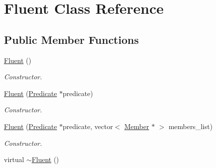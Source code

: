\hypertarget{classFluent}{\section{Fluent Class Reference}
\label{classFluent}
}
\subsection*{Public Member Functions}
\begin{DoxyCompactItemize}
\item 
\hypertarget{classFluent_a6305aaaef1dbd758c02ef9666f4e2b80}{\hyperlink{classFluent_a6305aaaef1dbd758c02ef9666f4e2b80}{Fluent} ()}\label{classFluent_a6305aaaef1dbd758c02ef9666f4e2b80}

\begin{DoxyCompactList}\small\item\em Constructor. \end{DoxyCompactList}\item 
\hyperlink{classFluent_ad70bec3e7ab68b2fb5017db6cbd56285}{Fluent} (\hyperlink{classPredicate}{Predicate} $\ast$predicate)
\begin{DoxyCompactList}\small\item\em Constructor. \end{DoxyCompactList}\item 
\hyperlink{classFluent_a16ceb20e80b8e434fc23a510d0665da5}{Fluent} (\hyperlink{classPredicate}{Predicate} $\ast$predicate, vector$<$ \hyperlink{classMember}{Member} $\ast$ $>$ members\+\_\+list)
\begin{DoxyCompactList}\small\item\em Constructor. \end{DoxyCompactList}\item 
\hypertarget{classFluent_a39d67a978f252e98968c088cd84ec5c9}{virtual \hyperlink{classFluent_a39d67a978f252e98968c088cd84ec5c9}{$\sim$\+Fluent} ()}\label{classFluent_a39d67a978f252e98968c088cd84ec5c9}


\end{DoxyCompactItemize}
